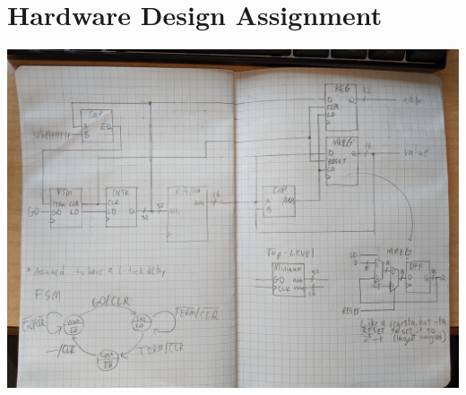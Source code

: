 \documentclass{article}
\begin{document}
\section{Hardware Design Assignment}
\centering
\includegraphics[width=\textwidth]{hw.jpg}
    
\end{document}
